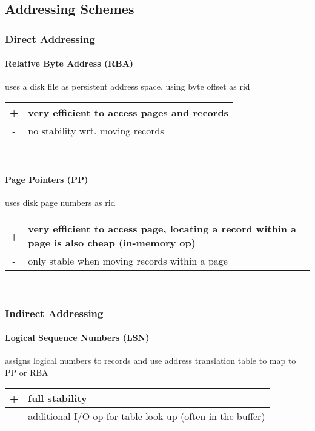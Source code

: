 \subsection{Addressing Schemes}
\subsubsection{Direct Addressing}

\paragraph{Relative Byte Address (RBA)} uses a disk file as persistent address space, using byte offset as rid \\
\begin{tabular}{c|p{6cm}} \hline
     + & very efficient to access pages and records \\ \hline
     - & no stability wrt. moving records 
\end{tabular} \\

\paragraph{Page Pointers (PP)} uses disk page numbers as rid \\
\begin{tabular}{c|p{6cm}} \hline
     + & very efficient to access page, locating a record within a page is also cheap (in-memory op) \\ \hline
     - & only stable when moving records within a page
\end{tabular} \\

\subsubsection{Indirect Addressing}

\paragraph{Logical Sequence Numbers (LSN)} assigns logical numbers to records and use address translation table to map to PP or RBA \\
\begin{tabular}{c|p{6cm}} \hline
     + & full stability \\ \hline
     - & additional I/O op for table look-up (often in the buffer)
\end{tabular} \\

